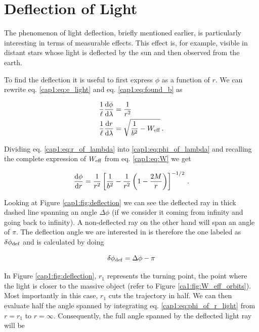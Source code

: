 

\section{Deflection of Light}

The phenomenon of light deflection, briefly mentioned earlier, is particularly
interesting in terms of measurable effects.
This effect is, for example, visible in distant stars whose light is deflected
by the sun and then observed from the earth.

To find the deflection it is useful to first express $\phi$ as a function of
$r$.
We can rewrite eq. \ref{cap1:eq:e_light} and eq. \ref{cap1:eq:found_b} as

\begin{subequations}
\begin{align}
    \frac{1}{\ell} \dv{\phi}{\lambda} &= \frac{1}{r^2}
    \label{cap1:eq:phi_of_lambda} \\
    \frac{1}{\ell} \dv{r}{\lambda} &= \sqrt{\frac{1}{b^2} - W_{\rm eff}}
    \label{cap1:eq:r_of_lambda} \, .
\end{align}
\end{subequations}

Dividing eq. \ref{cap1:eq:r_of_lambda} into \ref{cap1:eq:phi_of_lambda} and
recalling the complete expression of $W_{\rm eff}$ from eq. \ref{cap1:eq:W} we
get

\begin{equation}
    \dv{\phi}{r} = \frac{1}{r^2} \left[\frac{1}{b^2}
    - \frac{1}{r^2} \left(1 - \frac{2M}{r} \right) \right]^{-1/2} \, .
    \label{cap1:eq:phi_of_r_light}
\end{equation}

Looking at Figure \ref{cap1:fig:deflection} we can see the deflected ray in
thick dashed line spanning an angle $\Delta \phi$ (if we consider it coming from
infinity and going back to infinity).
A non-deflected ray on the other hand will span an angle of $\pi$.
The deflection angle we are interested in is therefore the one labeled as
$\delta \phi_{\rm def}$ and is calculated by doing

\begin{equation}
    \delta \phi_{\rm def} = \Delta \phi - \pi
    \label{cap1:eq:delta_Delta}
\end{equation}

In Figure \ref{cap1:fig:deflection}, $r_1$ represents the turning point, the
point where the light is closer to the massive object (refer to Figure
\ref{ca1:fig:W_eff_orbits}).
Most importantly in this case, $r_1$ cuts the trajectory in half.
We can then evaluate half the angle spanned by integrating eq.
\ref{cap1:eq:phi_of_r_light} from $r = r_1$ to $r = \infty$.
Consequently, the full angle spanned by the deflected light ray will be

